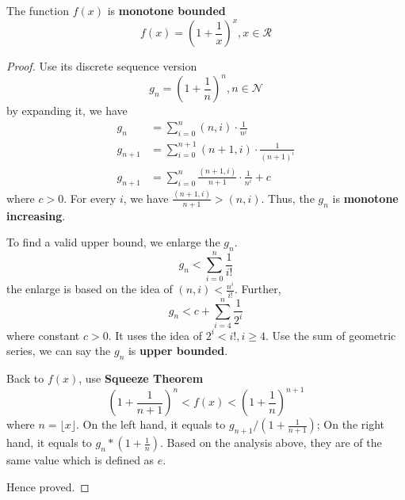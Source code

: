 \begin{proposition}
    \label{Proposition: Monotone bounded of e}
    The function $f(x)$ is \textbf{monotone bounded}
    \begin{equation*}
        f(x) = (1 + \frac{1}{x}) ^ x, x \in \mathcal{R}
    \end{equation*}

    \begin{proof}
        Use its discrete sequence version
        \begin{equation*}
            g_n = (1 + \frac{1}{n}) ^ n, n \in \mathcal{N}
        \end{equation*}
        by expanding it, we have
        \begin{align*}
            g_n     & = \sum_{i=0}^n (n, i) \cdot \frac{1}{n^i}                      \\
            g_{n+1} & = \sum_{i=0}^{n+1} (n+1, i) \cdot \frac{1}{(n+1)^i}            \\
            g_{n+1} & = \sum_{i=0}^{n} \frac{(n+1, i)}{n+1} \cdot \frac {1}{n^i} + c
        \end{align*}
        where $c > 0$.
        For every $i$, we have $\frac{(n+1, i)}{n+1} > (n, i) $.
        Thus, the $g_n$ is \textbf{monotone increasing}.

        To find a valid upper bound, we enlarge the $g_n$.
        \begin{equation*}
            g_n < \sum_{i=0}^{n} \frac{1}{i!}
        \end{equation*}
        the enlarge is based on the idea of $(n, i) < \frac{n^i}{i!}$.
        Further,
        \begin{equation*}
            g_n < c + \sum_{i=4}^{n} \frac{1}{2^i}
        \end{equation*}
        where constant $c > 0$.
        It uses the idea of $2^i < i!, i \geq 4$.
        Use the sum of geometric series, we can say the $g_n$ is \textbf{upper bounded}.

        Back to $f(x)$, use \textbf{Squeeze Theorem}
        \begin{equation*}
            (1+\frac{1}{n+1})^n < f(x) < (1+ \frac{1}{n})^{n+1}
        \end{equation*}
        where $n = \lfloor x \rfloor$.
        On the left hand, it equals to $g_{n+1} / (1 + \frac{1}{n+1})$;
        On the right hand, it equals to $g_{n} * (1 + \frac{1}{n})$.
        Based on the analysis above, they are of the same value which is defined as $e$.

        Hence proved.

    \end{proof}

\end{proposition}

